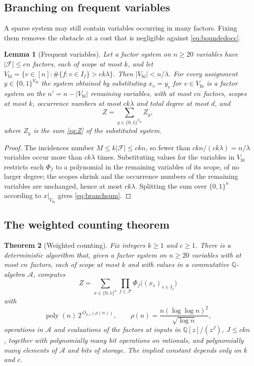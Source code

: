 \documentclass[11pt,reqno]{amsart}
\numberwithin{equation}{section}
\theoremstyle{plain}
\newtheorem{theorem}{Theorem}[section]
\newtheorem{lemma}[theorem]{Lemma}
\theoremstyle{definition}
\theoremstyle{remark}
\DeclareMathOperator{\poly}{poly}
\newcommand{\A}{\mathcal{A}}
\newcommand{\F}{\mathcal{F}}
\newcommand{\Q}{\mathbb{Q}}
\newcommand{\rhon}{\rho}
\begin{document}
\subsection{Branching on frequent variables}
A sparse system may still contain variables occurring in many factors. Fixing
them removes the obstacle at a cost that is negligible against
\eqref{eq:boundedocc}.

\begin{lemma}[Frequent variables]\label{lem:frequent}
Let a factor system on $n\ge 20$ variables have $|\F|\le cn$ factors, each of
scope at most $k$, and let $V_{\mathrm{hi}}=\{v\in[n]:\#\{f:v\in I_f\}>ck\lambda\}$.
Then $|V_{\mathrm{hi}}|<n/\lambda$. For every assignment
$y\in\{0,1\}^{V_{\mathrm{hi}}}$ the system obtained by substituting $x_v=y_v$ for
$v\in V_{\mathrm{hi}}$ is a factor system on the $n'=n-|V_{\mathrm{hi}}|$
remaining variables, with at most $cn$ factors, scopes at most $k$, occurrence
numbers at most $ck\lambda$ and total degree at most $d$, and
\begin{equation}\label{eq:branchsum}
  Z=\sum_{y\in\{0,1\}^{V_{\mathrm{hi}}}}Z_y ,
\end{equation}
where $Z_y$ is the sum \eqref{eq:Z} of the substituted system.
\end{lemma}

\begin{proof}
The incidences number $M\le k|\F|\le ckn$, so fewer than $ckn/(ck\lambda)=n/\lambda$
variables occur more than $ck\lambda$ times. Substituting values for the variables
in $V_{\mathrm{hi}}$ restricts each $\Phi_f$ to a polynomial in the remaining
variables of its scope, of no larger degree; the scopes shrink and the occurrence
numbers of the remaining variables are unchanged, hence at most $ck\lambda$.
Splitting the sum over $\{0,1\}^n$ according to $x|_{V_{\mathrm{hi}}}$ gives
\eqref{eq:branchsum}.
\end{proof}

\subsection{The weighted counting theorem}
\begin{theorem}[Weighted counting]\label{thm:weighted}
Fix integers $k\ge1$ and $c\ge1$. There is a deterministic algorithm that, given
a factor system on $n\ge 20$ variables with at most $cn$ factors, each of scope at
most $k$ and with values in a commutative $\Q$-algebra $\A$, computes
\[
  Z=\sum_{x\in\{0,1\}^n}\prod_{f\in\F}\Phi_f\bigl((x_v)_{v\in I_f}\bigr)
\]
with
\begin{equation}\label{eq:weightedtime}
  \poly(n)\,2^{\,O_{k,c}(\rhon(n))},\qquad \rhon(n)=\frac{n(\log\log n)^2}{\sqrt{\log n}},
\end{equation}
operations in $\A$ and evaluations of the factors at inputs in $\Q[z]/(z^J)$,
$J\le ckn$, together with polynomially many bit operations on rationals, and
polynomially many elements of $\A$ and bits of storage. The implied constant
depends only on $k$ and $c$.
\end{theorem}
\end{document}
